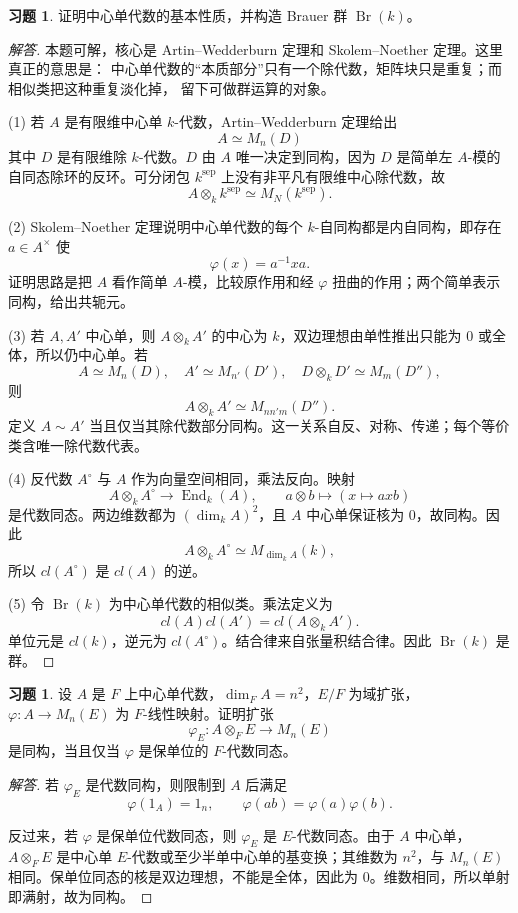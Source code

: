 \documentclass[11pt,a4paper,openany]{ctexbook}
\numberwithin{equation}{chapter}
\theoremstyle{plain}
\theoremstyle{definition}
\newtheorem{exercise}[theorem]{习题}
\theoremstyle{remark}
\begin{document}
\begin{exercise}
证明中心单代数的基本性质，并构造 Brauer 群 $\operatorname{Br}(k)$。
\end{exercise}

\begin{proof}[解答]
本题可解，核心是 Artin--Wedderburn 定理和 Skolem--Noether 定理。这里真正的意思是：
中心单代数的“本质部分”只有一个除代数，矩阵块只是重复；而相似类把这种重复淡化掉，
留下可做群运算的对象。

(1) 若 $A$ 是有限维中心单 $k$-代数，Artin--Wedderburn 定理给出
\[
 A\simeq M_n(D)
\]
其中 $D$ 是有限维除 $k$-代数。$D$ 由 $A$ 唯一决定到同构，因为 $D$ 是简单左 $A$-模的自同态除环的反环。可分闭包 $k^{\operatorname{sep}}$ 上没有非平凡有限维中心除代数，故
\[
 A\otimes_k k^{\operatorname{sep}}\simeq M_N(k^{\operatorname{sep}}).
\]

(2) Skolem--Noether 定理说明中心单代数的每个 $k$-自同构都是内自同构，即存在 $a\in A^\times$ 使
\[
 \varphi(x)=a^{-1}xa.
\]
证明思路是把 $A$ 看作简单 $A$-模，比较原作用和经 $\varphi$ 扭曲的作用；两个简单表示同构，给出共轭元。

(3) 若 $A,A'$ 中心单，则 $A\otimes_kA'$ 的中心为 $k$，双边理想由单性推出只能为 $0$ 或全体，所以仍中心单。若
\[
 A\simeq M_n(D),\quad A'\simeq M_{n'}(D'),\quad
 D\otimes_kD'\simeq M_m(D''),
\]
则
\[
 A\otimes_kA'\simeq M_{nn'm}(D'').
\]
定义 $A\sim A'$ 当且仅当其除代数部分同构。这一关系自反、对称、传递；每个等价类含唯一除代数代表。

(4) 反代数 $A^\circ$ 与 $A$ 作为向量空间相同，乘法反向。映射
\[
 A\otimes_kA^\circ\to \operatorname{End}_k(A),\qquad
 a\otimes b\mapsto(x\mapsto axb)
\]
是代数同态。两边维数都为 $(\dim_kA)^2$，且 $A$ 中心单保证核为 $0$，故同构。因此
\[
 A\otimes_kA^\circ\simeq M_{\dim_kA}(k),
\]
所以 $cl(A^\circ)$ 是 $cl(A)$ 的逆。

(5) 令 $\operatorname{Br}(k)$ 为中心单代数的相似类。乘法定义为
\[
 cl(A)cl(A')=cl(A\otimes_kA').
\]
单位元是 $cl(k)$，逆元为 $cl(A^\circ)$。结合律来自张量积结合律。因此 $\operatorname{Br}(k)$ 是群。
\end{proof}

\begin{exercise}
设 $A$ 是 $F$ 上中心单代数，$\dim_FA=n^2$，$E/F$ 为域扩张，$\varphi:A\to M_n(E)$ 为 $F$-线性映射。证明扩张
\[
 \varphi_E:A\otimes_FE\to M_n(E)
\]
是同构，当且仅当 $\varphi$ 是保单位的 $F$-代数同态。
\end{exercise}

\begin{proof}[解答]
若 $\varphi_E$ 是代数同构，则限制到 $A$ 后满足
\[
 \varphi(1_A)=1_n,\qquad \varphi(ab)=\varphi(a)\varphi(b).
\]

反过来，若 $\varphi$ 是保单位代数同态，则 $\varphi_E$ 是 $E$-代数同态。由于 $A$ 中心单，$A\otimes_FE$ 是中心单 $E$-代数或至少半单中心单的基变换；其维数为 $n^2$，与 $M_n(E)$ 相同。保单位同态的核是双边理想，不能是全体，因此为 $0$。维数相同，所以单射即满射，故为同构。
\end{proof}
\end{document}
